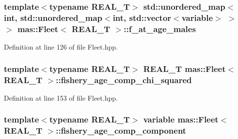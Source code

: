 \hypertarget{structmas_1_1_fleet_a1019367ebec70e8480fa5bcf76851d6f}{
\subsubsection[{f\-\_\-at\-\_\-age\-\_\-males}]{\setlength{\rightskip}{0pt plus 5cm}template$<$typename R\-E\-A\-L\-\_\-\-T$>$ std\-::unordered\-\_\-map$<$int, std\-::unordered\-\_\-map$<$int, std\-::vector$<${\bf variable}$>$ $>$ $>$ {\bf mas\-::\-Fleet}$<$ R\-E\-A\-L\-\_\-\-T $>$\-::f\-\_\-at\-\_\-age\-\_\-males}}\label{structmas_1_1_fleet_a1019367ebec70e8480fa5bcf76851d6f}


Definition at line 126 of file Fleet.\-hpp.

\hypertarget{structmas_1_1_fleet_a3eed643265324852c1b411a75d68cf21}{
\subsubsection[{fishery\-\_\-age\-\_\-comp\-\_\-chi\-\_\-squared}]{\setlength{\rightskip}{0pt plus 5cm}template$<$typename R\-E\-A\-L\-\_\-\-T$>$ R\-E\-A\-L\-\_\-\-T {\bf mas\-::\-Fleet}$<$ R\-E\-A\-L\-\_\-\-T $>$\-::fishery\-\_\-age\-\_\-comp\-\_\-chi\-\_\-squared}}\label{structmas_1_1_fleet_a3eed643265324852c1b411a75d68cf21}


Definition at line 153 of file Fleet.\-hpp.

\hypertarget{structmas_1_1_fleet_abff6202073d68fa9699506af85b124b3}{
\subsubsection[{fishery\-\_\-age\-\_\-comp\-\_\-component}]{\setlength{\rightskip}{0pt plus 5cm}template$<$typename R\-E\-A\-L\-\_\-\-T$>$ {\bf variable} {\bf mas\-::\-Fleet}$<$ R\-E\-A\-L\-\_\-\-T $>$\-::fishery\-\_\-age\-\_\-comp\-\_\-component}}\label{structmas_1_1_fleet_abff6202073d68fa9699506af85b124b3}


